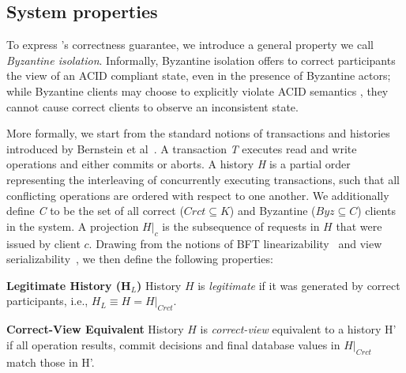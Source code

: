 \subsection{System properties}
To express \sys's correctness guarantee, we introduce a general property we call  {\em Byzantine isolation}. Informally, Byzantine isolation offers to correct participants the view of an ACID compliant state, even in the presence of Byzantine actors;  while Byzantine clients may choose to explicitly violate ACID semantics , they cannot cause correct clients to observe an inconsistent state. 
 

 More formally, we start from the standard notions of transactions and histories introduced by Bernstein et al~\cite{bernstein1987concurrency}. A transaction \textit{T} executes read and write operations and either commits or aborts. A history \textit{H} is a partial order representing the interleaving of concurrently executing transactions, such that all conflicting operations are ordered with respect to one another. We additionally define \textit{C} to be the set of all correct ($Crct \subseteq K$) and Byzantine ($Byz \subseteq C$) clients in the system.
A projection $H|_{c}$ is the subsequence of requests in $H$ that were issued by client $c$. Drawing from the notions of BFT linearizability~\cite{liskov2006tolerating} and view serializability~\cite{bernstein1987concurrency}, we then define the following properties:


\par\textbf{Legitimate History (H$_L$)} History $H$ is \textit{legitimate} if it was generated by correct participants, i.e., $H_L \equiv H = H|_{Crct}$.

\par\textbf{Correct-View Equivalent} History $H$ is \textit{correct-view} equivalent to a history H' if all operation results, commit decisions and final database values in  $H|_{Crct}$ match those in H'.



